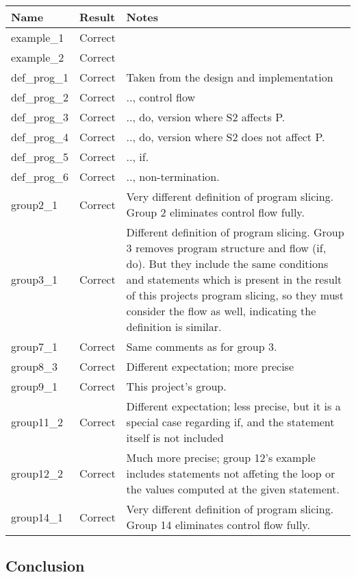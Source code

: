 \begin{tabular}{ |l||l|p{7cm}| }
\hline
  Name & Result & Notes \\
\hline
  example\_1		& Correct &  \\
\hline
  example\_2		& Correct &  \\
\hline
  def\_prog\_1		& Correct & Taken from the design and implementation \\
\hline
  def\_prog\_2		& Correct & .., control flow \\
\hline
  def\_prog\_3		& Correct & .., do, version where S2 affects P.\\
\hline
  def\_prog\_4		& Correct & .., do, version where S2 does not affect P. \\
\hline
  def\_prog\_5		& Correct & .., if. \\
\hline
  def\_prog\_6		& Correct & .., non-termination. \\
\hline
  group2\_1		& Correct &  Very different definition of program slicing.
Group 2 eliminates control flow fully.\\
\hline
  group3\_1		& Correct &  Different definition of program slicing.
Group 3 removes program structure and flow (if, do). But they include the same
conditions and statements which is present in the result of this projects program slicing,
so they must consider the flow as well, indicating the definition is similar.\\
\hline
  group7\_1		& Correct &  Same comments as for group 3.\\
\hline
  group8\_3		& Correct &  Different expectation; more precise\\
\hline
  group9\_1		& Correct &  This project's group.\\
\hline
  group11\_2		& Correct &  Different expectation; less precise,
but it is a special case regarding if, and the statement itself is not included\\
\hline
  group12\_2		& Correct &  Much more precise; group 12's example includes statements
not affeting the loop or the values computed at the given statement.\\
\hline
  group14\_1		& Correct &  Very different definition of program slicing.
Group 14 eliminates control flow fully.\\
\hline
\end{tabular}

\subsection{Conclusion}

